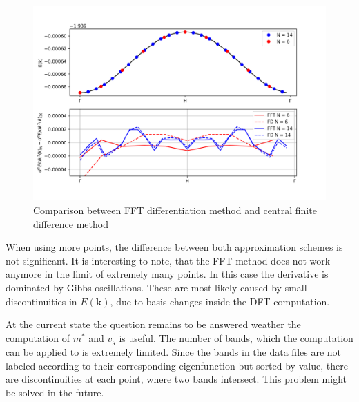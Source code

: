 \begin{figure}[htb!]
    \centering
    \includegraphics[width=0.7\linewidth]{christian/diff_compare.png}
    \caption{Comparison between FFT differentiation method and central finite difference method}
    \label{num_diff}
\end{figure}

When using more points, the difference between both approximation schemes is not significant. It is interesting to note, that the FFT method does not work anymore in the limit of extremely many points. In this case the derivative is dominated by Gibbs oscillations. These are most likely caused by small discontinuities in $E(\mathbf{k})$, due to basis changes inside the DFT computation.

At the current state the question remains to be answered weather the computation of $m^{*}$ and $v_g$ is useful. The number of bands, which the computation can be applied to is extremely limited. Since the bands in the data files are not labeled according to their corresponding eigenfunction but sorted by value, there are discontinuities at each point, where two bands intersect. This problem might be solved in the future. 













%
%    


